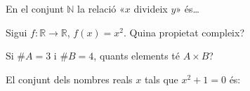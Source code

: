 \begin{enumerate}
\pregunta En el conjunt $\mathbb{N}$ la relació «$x$ divideix
$y$» és\ldots

\begin{enumerate}
\end{enumerate}
\feedback

\pregunta Sigui $f:\mathbb{R}\rightarrow\mathbb{R}$, $f(x)=x^{2}$. Quina propietat compleix?

\begin{enumerate}
\end{enumerate}
\feedback

\pregunta Si $\#A=3$ i $\#B=4$, quants elements té $A\times B$?

\begin{enumerate}
\end{enumerate}
\feedback

\pregunta El conjunt dels nombres reals $x$ tals que $x^{2}+1=0$ és:

\begin{enumerate}
\end{enumerate}
\feedback

\end{enumerate}
